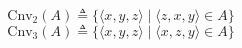 $$\mathrm{Cnv}_2(A) \triangleq \{\langle x, y, z \rangle \mid \langle z, x, y \rangle \in A\}$$
$$\mathrm{Cnv}_3(A) \triangleq \{\langle x, y, z \rangle \mid \langle x, z, y \rangle \in A\}$$
